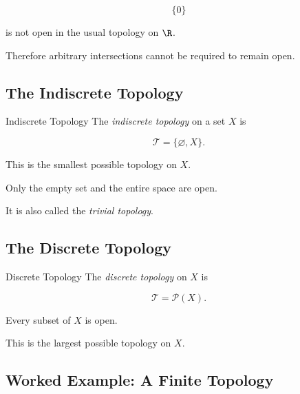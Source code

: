 \[
\{0\}
\]

is not open in the usual topology on \(\R\).

Therefore arbitrary intersections cannot be required to remain open.

\subsection{The Indiscrete Topology}
\label{subsec:indiscrete-topology}

\begin{definitionbox}{Indiscrete Topology}
The \emph{indiscrete topology} on a set \(X\) is

\[
\boxed{
\mathcal{T}
=
\{\varnothing,X\}.
}
\]
\end{definitionbox}

This is the smallest possible topology on \(X\).

Only the empty set and the entire space are open.

It is also called the \emph{trivial topology}.

\subsection{The Discrete Topology}
\label{subsec:discrete-topology}

\begin{definitionbox}{Discrete Topology}
The \emph{discrete topology} on \(X\) is

\[
\boxed{
\mathcal{T}
=
\mathcal{P}(X).
}
\]
\end{definitionbox}

Every subset of \(X\) is open.

This is the largest possible topology on \(X\).

\subsection{Worked Example: A Finite Topology}
\label{subsec:worked-finite-topology}

